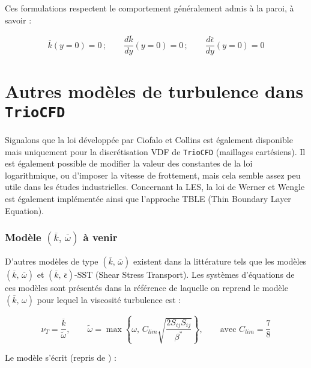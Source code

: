 Ces formulations respectent le comportement g\'en\'eralement admis \`a la
paroi, \`a savoir :

\[
\overline{k}(y=0)=0\,;\qquad\frac{d\overline{k}}{dy}(y=0)=0\,;\qquad\frac{d\overline{\epsilon}}{dy}(y=0)=0
\]



\section{Autres mod\`eles de turbulence dans \texttt{TrioCFD}}

Signalons que la loi d\'evelopp\'ee par Ciofalo et Collins \cite{Ciofalo-Collins_NHTB1989}
est \'egalement disponible mais uniquement pour la discr\'etisation VDF
de \texttt{TrioCFD} (maillages cart\'esiens). Il est \'egalement possible
de modifier la valeur des constantes de la loi logarithmique, ou d\textquoteright imposer
la vitesse de frottement, mais cela semble assez peu utile dans les
\'etudes industrielles. Concernant la LES, la loi de Werner et Wengle
est \'egalement impl\'ement\'ee \cite{Werner-Wengle_Proc1991} ainsi que
l\textquoteright approche TBLE (Thin Boundary Layer Equation).


\subsubsection*{Mod\`ele $(\overline{k},\,\overline{\omega})$ \`a venir}

D'autres mod\`eles de type $(\overline{k},\,\overline{\omega})$ existent
dans la litt\'erature tels que les mod\`eles $(\overline{k},\,\overline{\omega})$
et $(\overline{k},\,\overline{\epsilon})$-SST (Shear Stress Transport).
Les syst\`emes d'\'equations de ces mod\`eles sont pr\'esent\'es dans la r\'ef\'erence
\cite[sec 2.3.6 pp. 701--705]{Argyropoulos-Markatos_ReviewTurbulence_AMM2015}
de laquelle on reprend le mod\`ele $(\overline{k},\,\omega)$ pour lequel
la viscosit\'e turbulence est :

\[
\nu_{T}=\frac{\overline{k}}{\tilde{\omega}},\qquad\tilde{\omega}=\max\left\{ \omega,\,C_{lim}\sqrt{\frac{2S_{ij}S_{ij}}{\beta^{*}}}\right\} ,\qquad\mbox{avec }C_{lim}=\frac{7}{8}
\]


Le mod\`ele s'\'ecrit \cite[p. 702]{Argyropoulos-Markatos_ReviewTurbulence_AMM2015}
(repris de \cite{Wilcox_AIAA1988}) :

